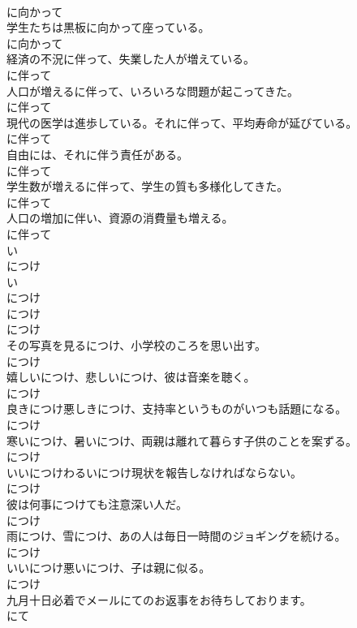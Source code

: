 \documentclass[8pt]{extreport}
\begin{document}
\begin{CJK}{UTF8}{min}
\\	に向かって
\\	学生たちは黒板に向かって座っている。	
\\	に向かって
\\	経済の不況に伴って、失業した人が増えている。	
\\	に伴って
\\	人口が増えるに伴って、いろいろな問題が起こってきた。	
\\	に伴って
\\	現代の医学は進歩している。それに伴って、平均寿命が延びている。	
\\	に伴って
\\	自由には、それに伴う責任がある。	
\\	に伴って
\\	学生数が増えるに伴って、学生の質も多様化してきた。	
\\	に伴って
\\	人口の増加に伴い、資源の消費量も増える。	
\\	に伴って
\\	い
\\	につけ 
\\	い
\\	につけ 
\\	につけ 
\\	につけ
\\	その写真を見るにつけ、小学校のころを思い出す。	
\\	につけ
\\	嬉しいにつけ、悲しいにつけ、彼は音楽を聴く。	
\\	につけ
\\	良きにつけ悪しきにつけ、支持率というものがいつも話題になる。	
\\	につけ
\\	寒いにつけ、暑いにつけ、両親は離れて暮らす子供のことを案ずる。	
\\	につけ
\\	いいにつけわるいにつけ現状を報告しなければならない。	
\\	につけ
\\	彼は何事につけても注意深い人だ。	
\\	につけ
\\	雨につけ、雪につけ、あの人は毎日一時間のジョギングを続ける。	
\\	につけ
\\	いいにつけ悪いにつけ、子は親に似る。	
\\	につけ
\\	九月十日必着でメールにてのお返事をお待ちしております。	
\\	にて

\end{CJK}
\end{document}
